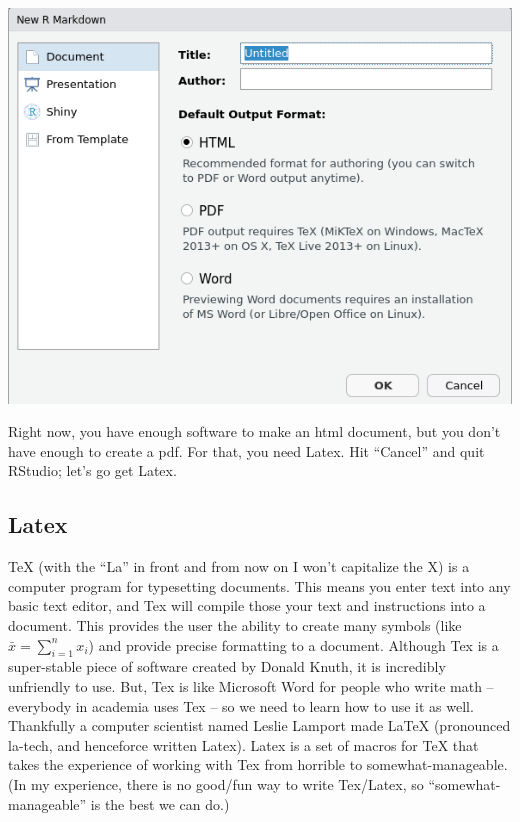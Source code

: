 \documentclass{article}\usepackage[]{graphicx}\usepackage[]{color}
\begin{document}
\begin{center}
  \includegraphics[width=0.5\linewidth,keepaspectratio]{rmarkdown_popup.png}
\end{center}

Right now, you have enough software to make an html document, but you don't have enough to create a pdf. For that, you need Latex. Hit ``Cancel'' and quit RStudio; let's go get Latex.

\subsection*{Latex} %

TeX (with the ``La'' in front and from now on I won't capitalize the X) is a computer program for typesetting documents. This means you enter text into any basic text editor, and Tex will compile those your text and instructions into a document. This provides the user the ability to create many symbols (like $\bar{x} = \sum_{i=1}^n x_i$) and provide precise formatting to a document. Although Tex is a super-stable piece of software created by Donald Knuth, it is incredibly unfriendly to use. But, Tex is like Microsoft Word for people who write math -- everybody in academia uses Tex -- so we need to learn how to use it as well. Thankfully a computer scientist named Leslie Lamport made LaTeX (pronounced la-tech, and henceforce written Latex). Latex is a set of macros for TeX that takes the experience of working with Tex from horrible to somewhat-manageable. (In my experience, there is no good/fun way to write Tex/Latex, so ``somewhat-manageable'' is the best we can do.) 
\end{document}
